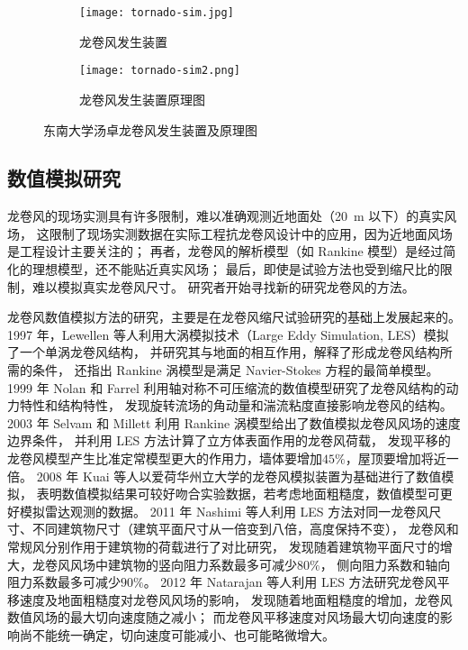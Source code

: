 \begin{figure}[!htbp]
	\begin{subfigure}[b]{0.5\textwidth}
		\centering
		\texttt{[image: tornado-sim.jpg]}
    \caption{龙卷风发生装置}\label{fig:seu-tornado}
	\end{subfigure}
	\begin{subfigure}[b]{0.5\textwidth}
		\centering
    \texttt{[image: tornado-sim2.png]}
		\caption{龙卷风发生装置原理图}\label{fig:seu-tornado2}
	\end{subfigure}
	\caption{东南大学汤卓龙卷风发生装置及原理图}\label{fig:seu-tang}
\end{figure}


\subsection{数值模拟研究}

龙卷风的现场实测具有许多限制，难以准确观测近地面处（\SI{20}{m} 以下）的真实风场，
这限制了现场实测数据在实际工程抗龙卷风设计中的应用，因为近地面风场是工程设计主要关注的；
再者，龙卷风的解析模型（如 Rankine 模型）是经过简化的理想模型，还不能贴近真实风场；
最后，即使是试验方法也受到缩尺比的限制，难以模拟真实龙卷风尺寸。
研究者开始寻找新的研究龙卷风的方法。

龙卷风数值模拟方法的研究，主要是在龙卷风缩尺试验研究的基础上发展起来的。
1997 年，Lewellen 等人\cite{lewellen1997large}利用大涡模拟技术（Large Eddy Simulation, LES）模拟了一个单涡龙卷风结构，
并研究其与地面的相互作用，解释了形成龙卷风结构所需的条件，
还指出 Rankine 涡模型是满足 Navier-Stokes 方程的最简单模型。
1999 年 Nolan 和 Farrel \cite{nolan1999structure}利用轴对称不可压缩流的数值模型研究了龙卷风结构的动力特性和结构特性，
发现旋转流场的角动量和湍流粘度直接影响龙卷风的结构。
2003 年 Selvam 和 Millett \cite{selvam2003computer}利用 Rankine 涡模型给出了数值模拟龙卷风风场的速度边界条件，
并利用 LES 方法计算了立方体表面作用的龙卷风荷载，
发现平移的龙卷风模型产生比准定常模型更大的作用力，墙体要增加$45\%$，屋顶要增加将近一倍。
2008 年 Kuai 等人\cite{kuai2008cfd}以爱荷华州立大学的龙卷风模拟装置为基础进行了数值模拟，
表明数值模拟结果可较好吻合实验数据，若考虑地面粗糙度，数值模型可更好模拟雷达观测的数据。
2011 年 Nashimi 等人\cite{alrasheedi2011computing}利用 LES 方法对同一龙卷风尺寸、不同建筑物尺寸（建筑平面尺寸从一倍变到八倍，高度保持不变），
龙卷风和常规风分别作用于建筑物的荷载进行了对比研究，
发现随着建筑物平面尺寸的增大，龙卷风风场中建筑物的竖向阻力系数最多可减少$80\%$，
侧向阻力系数和轴向阻力系数最多可减少$90\%$。
2012 年 Natarajan 等人\cite{natarajan2012large}利用 LES 方法研究龙卷风平移速度及地面粗糙度对龙卷风风场的影响，
发现随着地面粗糙度的增加，龙卷风数值风场的最大切向速度随之减小；
而龙卷风平移速度对风场最大切向速度的影响尚不能统一确定，切向速度可能减小、也可能略微增大。

